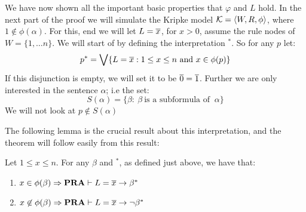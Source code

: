 \documentclass[../main.tex]{subfiles}
\begin{document}
We have now shown all the important basic properties that $\varphi$ and $L$ hold. In
the next part of the proof we will simulate the Kripke model $\mathcal{K}=\langle
W,R,\phi\rangle$, where $1\not\in\phi(\alpha)$. For this, end we will let $L=\overline x$,
for $x>0$, assume the rule nodes of
$W=\{1,\ldots n\}$. We will start of by defining the interpretation $^*$. So for any $p$ let:
	\[p^*=\bigvee\{L=\ol x:1\leq x\leq n\ \text{and}\ x\in \phi(p)\}\]
If this disjunction is empty, we will set it to be $\overline 0=\overline 1$. Further we
are only interested in the sentence $\alpha$; i.e the set:
$$S(\alpha)=\{\beta:\ \beta\ \text{is a subformula of }\ \alpha\}$$
We will not look at $p\not\in S(\alpha)$

The following lemma is the crucial result about this interpretation, and the
theorem will follow easily from this result:
\begin{lem}
	\label{lem:10}
	Let $1\leq x\leq n$. For any $\beta$ and $^*$, as defined just above, we
	have that:
	\begin{enumerate}
		\item $x\in\phi(\beta)\Rightarrow\text{\textbf{PRA}}\vdash L=\overline x\rightarrow
			\beta^*$
		\item $x\not\in\phi(\beta)\Rightarrow\text{\textbf{PRA}}\vdash L=\overline
			x\rightarrow \neg \beta^*$
	\end{enumerate}
\end{lem}
\end{document}
